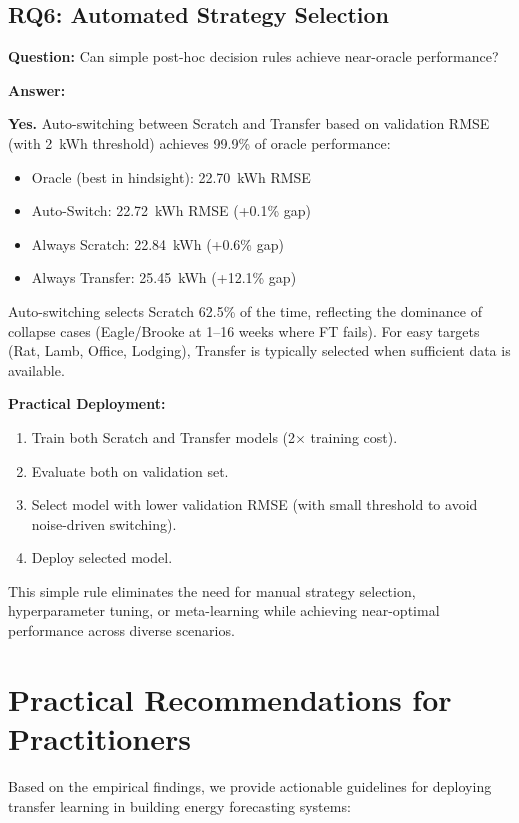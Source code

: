 \documentclass[12pt,a4paper]{report}
\begin{document}
\subsection{RQ6: Automated Strategy Selection}

\textbf{Question:} Can simple post-hoc decision rules achieve near-oracle performance?

\textbf{Answer:}

\textbf{Yes.} Auto-switching between Scratch and Transfer based on validation RMSE (with 2~kWh threshold) achieves 99.9\% of oracle performance:

\begin{itemize}
    \item Oracle (best in hindsight): 22.70~kWh RMSE
    \item Auto-Switch: 22.72~kWh RMSE (+0.1\% gap)
    \item Always Scratch: 22.84~kWh (+0.6\% gap)
    \item Always Transfer: 25.45~kWh (+12.1\% gap)
\end{itemize}

Auto-switching selects Scratch 62.5\% of the time, reflecting the dominance of collapse cases (Eagle/Brooke at 1--16 weeks where FT fails). For easy targets (Rat, Lamb, Office, Lodging), Transfer is typically selected when sufficient data is available.

\textbf{Practical Deployment:}

\begin{enumerate}
    \item Train both Scratch and Transfer models (2$\times$ training cost).
    \item Evaluate both on validation set.
    \item Select model with lower validation RMSE (with small threshold to avoid noise-driven switching).
    \item Deploy selected model.
\end{enumerate}

This simple rule eliminates the need for manual strategy selection, hyperparameter tuning, or meta-learning while achieving near-optimal performance across diverse scenarios.

\section{Practical Recommendations for Practitioners}

Based on the empirical findings, we provide actionable guidelines for deploying transfer learning in building energy forecasting systems:
\end{document}
